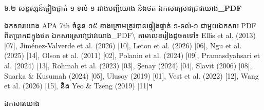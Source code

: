\documentclass[a4paper,12pt]{article}
\newcommand{\en}[1]{{\TimesEn #1}}
\newcommand{\enbf}[1]{{\TimesEn\bfseries #1}}
\newcommand{\refbanner}[1]{%
  \Needspace{2.2cm}%
  \begin{tcolorbox}[
    enhanced,
    colback=bannergray,
    colframe=bordergray,
    boxrule=0.9pt,
    leftrule=3.8pt,
    arc=2pt,
    top=6pt, bottom=6pt, left=9pt, right=9pt,
    before skip=10pt, after skip=6pt
  ]
    {\linespread{1.0}\muol\fontsize{12pt}{19pt}\selectfont #1}
  \end{tcolorbox}%
}
\newcommand{\subsec}[1]{%
  \Needspace{1.7cm}%
  \par\vspace{6pt}%
  {\linespread{1.0}\muol\fontsize{11.5pt}{18.5pt}\selectfont #1}%
  \par\vspace{2pt}%
}
\begin{document}
\subsec{៦.២ សន្ទស្សន៍ផ្ទៀងផ្ទាត់ ១-ទល់-១ រវាងបញ្ជីយោង និងថត ឯកសារស្រាវជ្រាវយោង\enbf{\_PDF}}
ឯកសារយោង \en{APA 7th} ចំនួន ១៥ ខាងក្រោមត្រូវបានផ្ទៀងផ្ទាត់ ១-ទល់-១ ជាមួយឯកសារ \en{PDF} ពិតប្រាកដក្នុងថត ឯកសារស្រាវជ្រាវយោង\en{\_PDF\textbackslash} តាមលេខរៀងដូចតទៅ៖
\en{Ellis et al. (2013) [07]},
\en{Jim\'enez-Valverde et al. (2026) [10]},
\en{Leton et al. (2026) [06]},
\en{Ngu et al. (2025) [14]},
\en{Olson et al. (2011) [02]},
\en{Polanin et al. (2024) [09]},
\en{Pramasdyahsari et al. (2024) [13]},
\en{Rohmah et al. (2023) [03]},
\en{\c{S}enay (2024) [04]},
\en{Slavit (2006) [08]},
\en{Suarka \& Kusumah (2024) [05]},
\en{Ulusoy (2019) [01]},
\en{Vest et al. (2022) [12]},
\en{Wang et al. (2026) [15]},
និង \en{Yeo \& Tzeng (2019) [11]}។

\refbanner{ឯកសារយោង}
\end{document}

